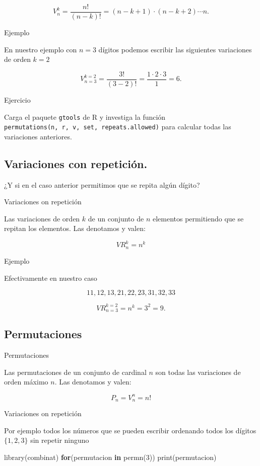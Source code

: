 \documentclass[
  letterpaper,
  DIV=11,
  numbers=noendperiod]{scrreprt}
\newenvironment{Shaded}{\begin{snugshade}}{\end{snugshade}}
\newcommand{\ControlFlowTok}[1]{\textcolor[rgb]{0.00,0.23,0.31}{\textbf{#1}}}
\newcommand{\DecValTok}[1]{\textcolor[rgb]{0.68,0.00,0.00}{#1}}
\newcommand{\FunctionTok}[1]{\textcolor[rgb]{0.28,0.35,0.67}{#1}}
\newcommand{\NormalTok}[1]{\textcolor[rgb]{0.00,0.23,0.31}{#1}}
\begin{document}
\[
V_n^k=\frac{n!}{(n-k)!}=(n-k+1)\cdot (n-k+2)\cdots n.
\]

Ejemplo

En nuestro ejemplo con \(n=3\) dígitos podemos escribir las siguientes
variaciones de orden \(k=2\)

\[
V^{k=2}_{n=3}=\frac{3!}{(3-2)!}=\frac{1\cdot 2\cdot 3}{1}=6.
\]

Ejercicio

Carga el paquete \texttt{gtools} de R y investiga la función
\texttt{permutations(n,\ r,\ v,\ set,\ repeats.allowed)} para calcular
todas las variaciones anteriores.

\subsection{Variaciones con
repetición.}\label{variaciones-con-repeticiuxf3n.}

¿Y si en el caso anterior permitimos que se repita algún dígito?

Variaciones on repetición

Las variaciones de orden \(k\) de un conjunto de \(n\) elementos
permitiendo que se repitan los elementos. Las denotamos y valen:

\[VR_n^k=n^k\]

Ejemplo

Efectivamente en nuestro caso

\[11,12,13,21,22,23,31,32,33\]

\[
VR^{k=2}_{n=3}=n^k=3^2=9.
\]

\subsection{Permutaciones}\label{permutaciones}

Permutaciones

Las permutaciones de un conjunto de cardinal \(n\) son todas las
variaciones de orden máximo \(n\). Las denotamos y valen:

\[
P_n=V_n^n=n!
\]

Variaciones on repetición

Por ejemplo todos los números que se pueden escribir ordenando todos los
dígitos \(\{1,2,3\}\) sin repetir ninguno

\begin{Shaded}
\begin{Highlighting}[]
\FunctionTok{library}\NormalTok{(combinat)}
\ControlFlowTok{for}\NormalTok{(permutacion }\ControlFlowTok{in} \FunctionTok{permn}\NormalTok{(}\DecValTok{3}\NormalTok{)) }\FunctionTok{print}\NormalTok{(permutacion)}
\end{Highlighting}
\end{Shaded}
\end{document}
